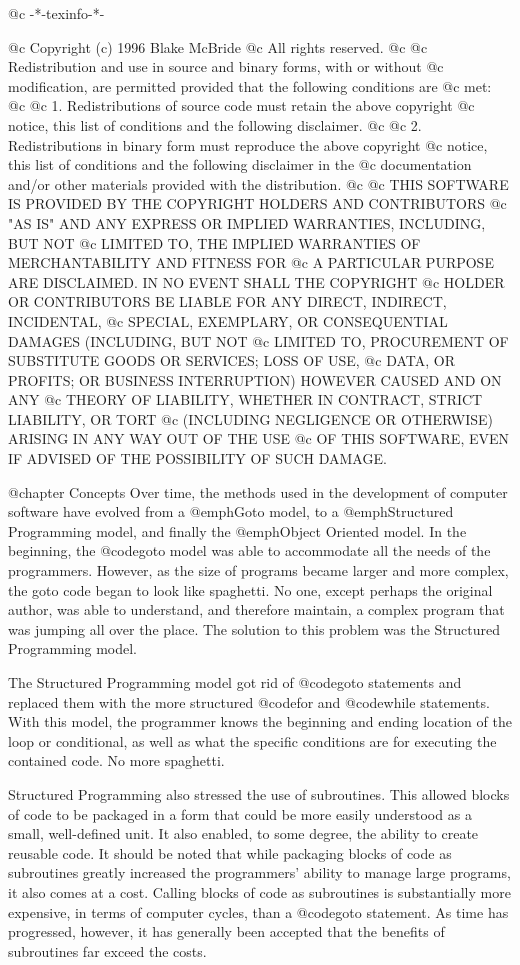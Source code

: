 @c -*-texinfo-*-

@c  Copyright (c) 1996 Blake McBride
@c  All rights reserved.
@c
@c  Redistribution and use in source and binary forms, with or without
@c  modification, are permitted provided that the following conditions are
@c  met:
@c
@c  1. Redistributions of source code must retain the above copyright
@c  notice, this list of conditions and the following disclaimer.
@c
@c  2. Redistributions in binary form must reproduce the above copyright
@c  notice, this list of conditions and the following disclaimer in the
@c  documentation and/or other materials provided with the distribution.
@c
@c  THIS SOFTWARE IS PROVIDED BY THE COPYRIGHT HOLDERS AND CONTRIBUTORS
@c  "AS IS" AND ANY EXPRESS OR IMPLIED WARRANTIES, INCLUDING, BUT NOT
@c  LIMITED TO, THE IMPLIED WARRANTIES OF MERCHANTABILITY AND FITNESS FOR
@c  A PARTICULAR PURPOSE ARE DISCLAIMED. IN NO EVENT SHALL THE COPYRIGHT
@c  HOLDER OR CONTRIBUTORS BE LIABLE FOR ANY DIRECT, INDIRECT, INCIDENTAL,
@c  SPECIAL, EXEMPLARY, OR CONSEQUENTIAL DAMAGES (INCLUDING, BUT NOT
@c  LIMITED TO, PROCUREMENT OF SUBSTITUTE GOODS OR SERVICES; LOSS OF USE,
@c  DATA, OR PROFITS; OR BUSINESS INTERRUPTION) HOWEVER CAUSED AND ON ANY
@c  THEORY OF LIABILITY, WHETHER IN CONTRACT, STRICT LIABILITY, OR TORT
@c  (INCLUDING NEGLIGENCE OR OTHERWISE) ARISING IN ANY WAY OUT OF THE USE
@c  OF THIS SOFTWARE, EVEN IF ADVISED OF THE POSSIBILITY OF SUCH DAMAGE.

@chapter Concepts
Over time, the methods used in the development of computer software have
evolved from a @emph{Goto} model, to a @emph{Structured Programming}
model, and finally the @emph{Object Oriented model}.  In the
beginning, the @code{goto} model was able to accommodate all the needs of the
programmers.  However, as the size of programs became larger and
more complex, the goto code began to look like spaghetti.  No one, except
perhaps the original author, was able to understand, and therefore
maintain, a complex program that was jumping all over the place.  The
solution to this problem was the Structured Programming model.

The Structured Programming model got rid of @code{goto} statements and
replaced them with the more structured @code{for} and @code{while}
statements.  With this model, the programmer knows the beginning and
ending location of the loop or conditional, as well as what the specific
conditions are for executing the contained code.  No more spaghetti.

Structured Programming also stressed the use of subroutines.  This
allowed blocks of code to be packaged in a form that could be more easily
understood as a small, well-defined unit.  It also enabled, to some
degree, the ability to create reusable code.  It should be noted that
while packaging blocks of code as subroutines greatly increased the
programmers' ability to manage large programs, it also comes at a cost.
Calling blocks of code as subroutines is substantially more expensive,
in terms of computer cycles, than a @code{goto} statement.  As time has
progressed, however, it has generally been accepted that the benefits of
subroutines far exceed the costs.

